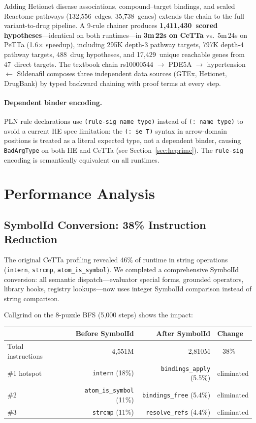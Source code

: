 \documentclass[11pt]{article}
\newcommand{\code}[1]{\texttt{#1}}
\newcommand{\PeTTa}{\textup{PeTTa}}
\newcommand{\CeTTa}{\textup{CeTTa}}
\begin{document}
Adding Hetionet disease associations, compound--target bindings,
and scaled Reactome pathways (132{,}556~edges, 35{,}738~genes)
extends the chain to the full variant-to-drug pipeline.  A 9-rule
chainer produces \textbf{1{,}411{,}430~scored hypotheses}---identical
on both runtimes---in \textbf{3m\,22s on \CeTTa{}} vs.\ 5m\,24s on
\PeTTa{} (1.6$\times$ speedup), including 295K depth-3 pathway targets,
797K depth-4 pathway targets, 488~drug hypotheses, and 17{,}429~unique
reachable genes from 47~direct targets.  The textbook chain
rs10000544 $\to$ PDE5A $\to$ hypertension $\leftarrow$ Sildenafil
composes three independent data sources (GTEx, Hetionet, DrugBank) by
typed backward chaining with proof terms at every step.

\paragraph{Dependent binder encoding.}
PLN rule declarations use \code{(rule-sig name type)} instead of
\code{(: name type)} to avoid a current HE spec limitation: the
\code{(: \$e T)} syntax in arrow-domain positions is treated as a
literal expected type, not a dependent binder, causing \code{BadArgType}
on both HE and \CeTTa{} (see Section~\ref{sec:heprime}).
The \code{rule-sig} encoding is semantically equivalent on all runtimes.

\section{Performance Analysis}

\subsection{SymbolId Conversion: 38\% Instruction Reduction}

The original \CeTTa{} profiling revealed 46\% of runtime in string
operations (\code{intern}, \code{strcmp}, \code{atom\_is\_symbol}).
We completed a comprehensive SymbolId conversion: all semantic
dispatch---evaluator special forms, grounded operators, library hooks,
registry lookups---now uses integer SymbolId comparison instead of
string comparison.

Callgrind on the 8-puzzle BFS (5{,}000 steps) shows the impact:

\begin{center}
\begin{tabular}{lrrl}
\toprule
& Before SymbolId & After SymbolId & Change \\
\midrule
Total instructions & 4{,}551M & 2{,}810M & $-$38\% \\
\#1 hotspot & \code{intern} (18\%) & \code{bindings\_apply} (5.5\%) & eliminated \\
\#2 & \code{atom\_is\_symbol} (11\%) & \code{bindings\_free} (5.4\%) & eliminated \\
\#3 & \code{strcmp} (11\%) & \code{resolve\_refs} (4.4\%) & eliminated \\
\bottomrule
\end{tabular}
\end{center}
\end{document}
